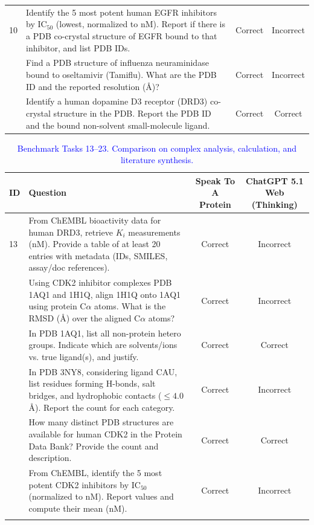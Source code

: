 \documentclass{article}
\newcommand{\new}[1]{\textcolor{blue}{#1}}
\newcommand{\newtable}{\color{blue}}
\newcommand{\new}[1]{#1}
\newcommand{\newtable}{}
\begin{document}
\begin{table}[h]
\begin{tabularx}{\textwidth}{p{0.5cm} X c c}
10 & Identify the 5 most potent human EGFR inhibitors by IC$_{50}$ (lowest, normalized to nM). Report if there is a PDB co-crystal structure of EGFR bound to that inhibitor, and list PDB IDs. & Correct & Incorrect \\ \addlinespace
11 & Find a PDB structure of influenza neuraminidase bound to oseltamivir (Tamiflu). What are the PDB ID and the reported resolution (\AA{})? & Correct & Incorrect \\ \addlinespace
12 & Identify a human dopamine D3 receptor (DRD3) co-crystal structure in the PDB. Report the PDB ID and the bound non-solvent small-molecule ligand. & Correct & Correct \\
\bottomrule
\end{tabularx}
\end{table}

\begin{table}[h]
\newtable
\caption{\new{Benchmark Tasks 13--23. Comparison on complex analysis, calculation, and literature synthesis.}}
\centering
\small
\begin{tabularx}{\textwidth}{p{0.5cm} X c c}
\toprule
\textbf{ID} & \textbf{Question} & \textbf{Speak To A Protein} & \textbf{ChatGPT 5.1 Web (Thinking)} \\
\midrule
13 & From ChEMBL bioactivity data for human DRD3, retrieve $K_i$ measurements (nM). Provide a table of at least 20 entries with metadata (IDs, SMILES, assay/doc references). & Correct & Incorrect \\ \addlinespace
14 & Using CDK2 inhibitor complexes PDB 1AQ1 and 1H1Q, align 1H1Q onto 1AQ1 using protein C$\alpha$ atoms. What is the RMSD (\AA{}) over the aligned C$\alpha$ atoms? & Correct & Incorrect \\ \addlinespace
15 & In PDB 1AQ1, list all non-protein hetero groups. Indicate which are solvents/ions vs. true ligand(s), and justify. & Correct & Correct \\ \addlinespace
16 & In PDB 3NY8, considering ligand CAU, list residues forming H-bonds, salt bridges, and hydrophobic contacts ($\le 4.0$ \AA{}). Report the count for each category. & Correct & Incorrect \\ \addlinespace
17 & How many distinct PDB structures are available for human CDK2 in the Protein Data Bank? Provide the count and description. & Correct & Correct \\ \addlinespace
18 & From ChEMBL, identify the 5 most potent CDK2 inhibitors by IC$_{50}$ (normalized to nM). Report values and compute their mean (nM). & Correct & Incorrect \\ \addlinespace

\end{tabularx}
\end{table}
\end{document}
